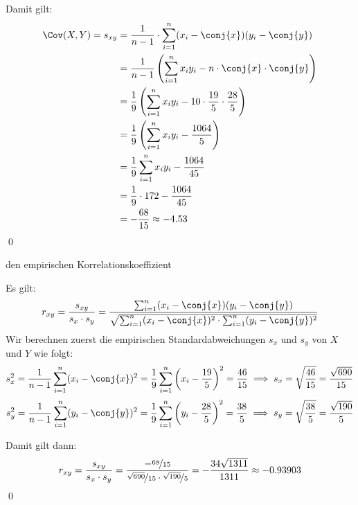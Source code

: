 \documentclass{abgabe}
\begin{document}
\begin{questions}
\begin{parts}
\begin{subparts}
\begin{solution}
                Damit gilt:
                \begin{alignat*}{1}
                    \Cov(X, Y) = s_{xy} & = \frac{1}{n-1} \cdot \sum_{i=1}^{n} (x_i - \conj{x})(y_i - \conj{y})                         \\
                                        & = \frac{1}{n-1} \left( \sum_{i=1}^{n} x_iy_i - n \cdot \conj{x} \cdot \conj{y} \right)        \\
                                        & = \frac{1}{9} \left( \sum_{i=1}^{n} x_iy_i - 10 \cdot \frac{19}{5} \cdot \frac{28}{5} \right) \\
                                        & = \frac{1}{9} \left( \sum_{i=1}^{n} x_iy_i - \frac{1064}{5} \right)                           \\
                                        & = \frac{1}{9} \sum_{i=1}^{n} x_iy_i - \frac{1064}{45}                                         \\
                                        & = \frac{1}{9} \cdot 172 - \frac{1064}{45}                                                     \\
                                        & = -\frac{68}{15} \approx -4.53
                \end{alignat*}
                \qed
            \end{solution}

            \newpage
            \subpart
            den empirischen Korrelationskoeffizient
            \begin{solution}
                Es gilt:
                \[
                    r_{xy} = \frac{s_{xy}}{s_x \cdot s_y} = \frac{\sum_{i=1}^{n} (x_i - \conj{x})(y_i - \conj{y})}{\sqrt{\sum_{i=1}^{n} (x_i - \conj{x})^2 \cdot \sum_{i=1}^{n} (y_i - \conj{y})^2 }}
                \]
                Wir berechnen zuerst die empirischen Standardabweichungen $s_x$ und $s_y$ von $X$ und $Y$ wie folgt:
                \[
                    s_x^2 = \frac{1}{n-1} \sum_{i=1}^{n} (x_i - \conj{x})^2 = \frac{1}{9} \sum_{i=1}^{n} \left(x_i - \frac{19}{5} \right)^2 = \frac{46}{15} \implies s_x = \sqrt{\frac{46}{15}} = \frac{\sqrt{690}}{15}
                \]
                \[
                    s_y^2 = \frac{1}{n-1} \sum_{i=1}^{n} (y_i - \conj{y})^2 = \frac{1}{9} \sum_{i=1}^{n} \left(y_i - \frac{28}{5} \right)^2 = \frac{38}{5} \implies s_y = \sqrt{\frac{38}{5}} = \frac{\sqrt{190}}{5}
                \]

                Damit gilt dann:
                \[
                    r_{xy} = \frac{s_{xy}}{s_x \cdot s_y} = \frac{-\nicefrac{68}{15}}{\nicefrac{\sqrt{690}}{15} \cdot \nicefrac{\sqrt{190}}{5}} = - \frac{34\sqrt{1311}}{1311} \approx -0.93903
                \]
                \qed
            \end{solution}


\end{subparts}
\end{parts}
\end{questions}
\end{document}
